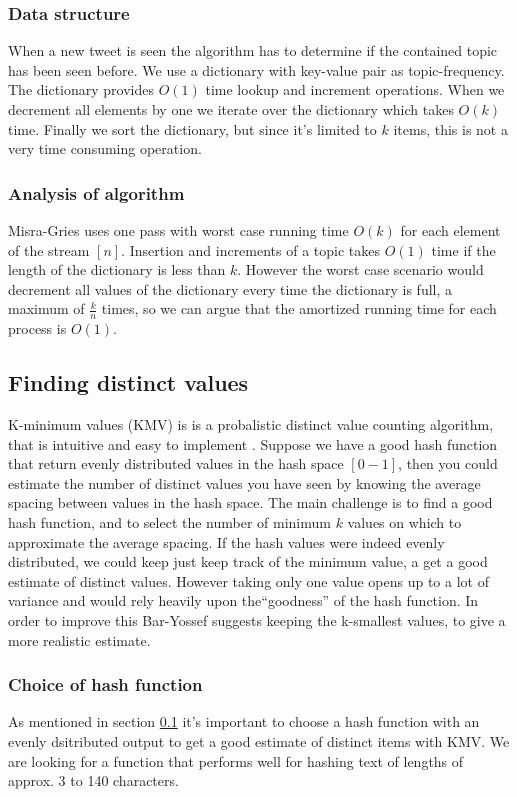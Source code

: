 \subsubsection{Data structure}
When a new tweet is seen the algorithm has to determine if the contained topic has been seen before. We use a dictionary with key-value pair as topic-frequency. The dictionary provides $O(1)$ time lookup and increment operations. When we decrement all elements by one we iterate over the dictionary which takes $O(k)$ time. Finally we sort the dictionary, but since it's limited to $k$ items, this is not a very time consuming operation.

\subsubsection{Analysis of algorithm}\label{algo-analysis}
Misra-Gries uses one pass with worst case running time $O(k)$ for each element of the stream $[n]$. Insertion and increments of a topic takes $O(1)$ time if the length of the dictionary is less than $k$. However the worst case scenario would decrement all values of the dictionary every time the dictionary is full, a maximum of $\frac{k}{n}$ times, so we can argue that the amortized running time for each process is $O(1)$.

\subsection{Finding distinct values}\label{algo-distinct}
K-minimum values (KMV) is is a probalistic distinct value counting algorithm, that is intuitive and easy to implement \cite{kmv}. Suppose we have a good hash function that return evenly distributed values in the hash space $[0-1]$, then you could estimate the number of distinct values you have seen by knowing the average spacing between values in the hash space. The main challenge is to find a good hash function, and to select the number of minimum $k$ values on which to approximate the average spacing. If the hash values were indeed evenly distributed, we could keep just keep track of the minimum value, a get a good estimate of distinct values. However taking only one value opens up to a lot of variance and would rely heavily upon the``goodness'' of the hash function. In order to improve this Bar-Yossef\cite{Bar-Yossef} suggests keeping the k-smallest values, to give a more realistic estimate.

\subsubsection{Choice of hash function}\label{hash-function}
As mentioned in section \ref{algo-distinct} it's important to choose a hash function with an evenly dsitributed output to get a good estimate of distinct items with KMV. We are looking for a function that performs well for hashing text of lengths of approx. 3 to 140 characters. 

